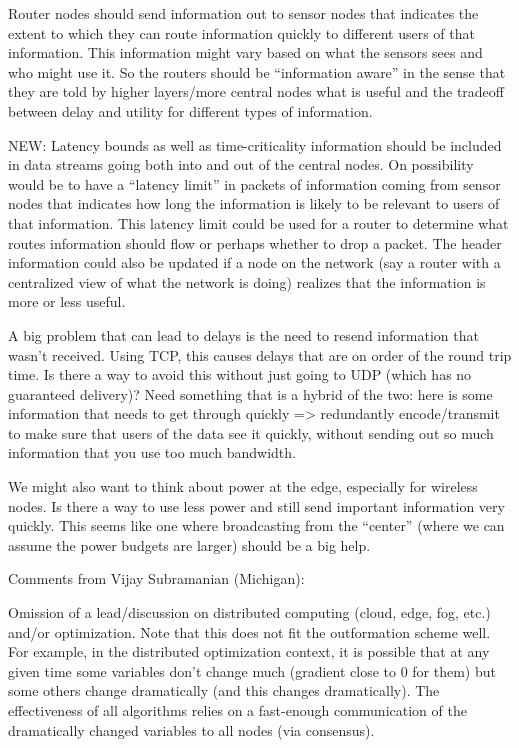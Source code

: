 \documentclass[12pt,letterpaper]{article}
\begin{document}
Router nodes should send information out to sensor nodes that indicates the extent to which they can route information quickly to different users of that information.  This information might vary based on what the sensors sees and who might use it.  So the routers should be “information aware” in the sense that they are told by higher layers/more central nodes what is useful and the tradeoff between delay and utility for different types of information.

NEW: Latency bounds as well as time-criticality information should be included in data streams going both into and out of the central nodes.  On possibility would be to have a “latency limit” in packets of information coming from sensor nodes that indicates how long the information is likely to be relevant to users of that information.  This latency limit could be used for a router to determine what routes information should flow or perhaps whether to drop a packet.  The header information could also be updated if a node on the network (say a router with a centralized view of what the network is doing) realizes that the information is more or less useful.

A big problem that can lead to delays is the need to resend information that wasn’t received.  Using TCP, this causes delays that are on order of the round trip time.  Is there a way to avoid this without just going to UDP (which has no guaranteed delivery)?  Need something that is a hybrid of the two: here is some information that needs to get through quickly => redundantly encode/transmit to make sure that users of the data see it quickly, without sending out so much information that you use too much bandwidth.

We might also want to think about power at the edge, especially for wireless nodes.  Is there a way to use less power and still send important information very quickly.  This seems like one where broadcasting from the “center” (where we can assume the power budgets are larger) should be a big help.    

Comments from Vijay Subramanian (Michigan):

Omission of a lead/discussion on distributed computing (cloud, edge, fog, etc.) and/or optimization. Note that this does not fit the outformation scheme well. For example, in the distributed optimization context, it is possible that at any given time some variables don't change much (gradient close to 0 for them) but some others change dramatically (and this changes dramatically). The effectiveness of all algorithms relies on a fast-enough communication of the dramatically changed variables to all nodes (via consensus).
\end{document}
